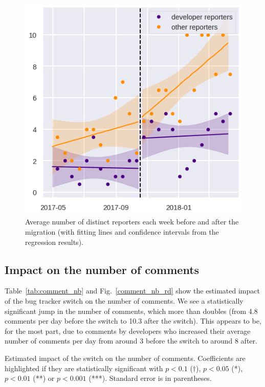 \documentclass[conference]{IEEEtran}
\begin{document}
\begin{figure}
\includegraphics{reporter_nb_rd.png}
\caption{Average number of distinct reporters each week before and after the migration (with fitting lines and confidence intervals from the regression results).} \label{reporter_nb_rd}
\end{figure}

\subsection{Impact on the number of comments}

Table~\ref{tab:comment_nb} and Fig.~\ref{comment_nb_rd} show the estimated impact of the bug tracker switch on the number of comments. We see a statistically significant jump in the number of comments, which more than doubles (from 4.8 comments per day before the switch to 10.3 after the switch). This appears to be, for the most part, due to comments by developers who increased their average number of comments per day from around 3 before the switch to around 8 after.

\begin{table}
\centering
\caption{Estimated impact of the switch on the number of comments. Coefficients are highlighted if they are statistically significant with $p<0.1$ ($\dagger$), $p<0.05$ (*), $p<0.01$ (**) or $p<0.001$ (***). Standard error is in parentheses.}
\label{tab:comment_nb}

\end{table}
\end{document}
